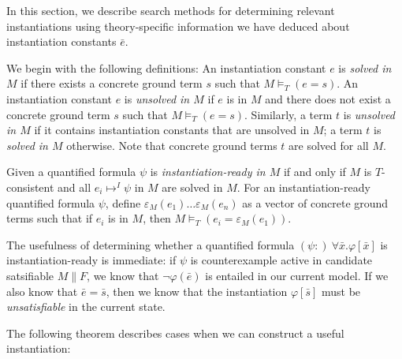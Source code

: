\documentclass{llncs}
\begin{document}
In this section, we describe search methods for determining relevant instantiations using theory-specific information we have deduced about instantiation constants $\bar{e}$.

We begin with the following definitions:
An instantiation constant $e$ is \emph{solved in $M$} if there exists a concrete ground term $s$ such that $M \models_T (e = s)$.
An instantiation constant $e$ is \emph{unsolved in $M$} if $e$ is in $M$ and there does not exist a concrete ground term $s$ such that $M \models_T (e = s)$.
Similarly, a term $t$ is \emph{unsolved in $M$} if it contains instantiation constants that are unsolved in $M$; a term $t$ is \emph{solved in $M$} otherwise.
Note that concrete ground terms $t$ are solved for all $M$.

Given a quantified formula $\psi$ is \emph{instantiation-ready in $M$} if and only if $M$ is $T$-consistent and all $e_i \mapsto^I \psi$ in $M$ are solved in $M$.
For an instantiation-ready quantified formula $\psi$, define $\varepsilon_M( e_1 ) \ldots \varepsilon_M( e_n )$ as a vector of concrete ground terms such that if $e_i$ is in $M$, then $M \models_T (e_i = \varepsilon_M( e_1 ))$.

The usefulness of determining whether a quantified formula $(\psi:) \ \forall \bar{x}. \varphi[ \bar{x} ]$ is instantiation-ready is immediate:  if $\psi$ is counterexample active in candidate satsifiable $M \parallel F$, we know that $\neg \varphi( \bar{e} )$ is entailed in our current model.
If we also know that $\bar{e} = \bar{s}$, then we know that the instantiation $\varphi[ \bar{s} ]$ must be \emph{unsatisfiable} in the current state.

The following theorem describes cases when we can construct a useful instantiation:
\end{document}
